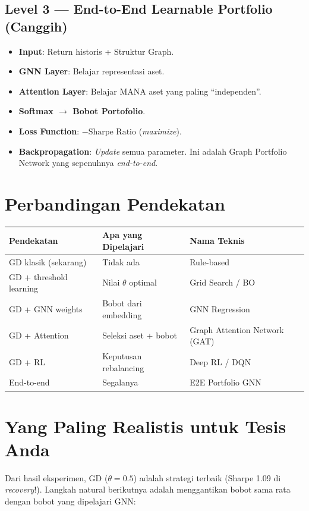 \documentclass{article}
\begin{document}
\subsection*{Level 3 — End-to-End Learnable Portfolio (Canggih)}
\begin{itemize}
    \item \textbf{Input}: Return historis + Struktur Graph.
    \item \textbf{GNN Layer}: Belajar representasi aset.
    \item \textbf{Attention Layer}: Belajar MANA aset yang paling ``independen''.
    \item \textbf{Softmax $\rightarrow$ Bobot Portofolio}.
    \item \textbf{Loss Function}: $-\text{Sharpe Ratio}$ (\textit{maximize}).
    \item \textbf{Backpropagation}: \textit{Update} semua parameter. Ini adalah Graph Portfolio Network yang sepenuhnya \textit{end-to-end}.
\end{itemize}

\section*{Perbandingan Pendekatan}

\begin{table}[h]
    \centering
    \begin{tabular}{lll}
        \toprule
        \textbf{Pendekatan} & \textbf{Apa yang Dipelajari} & \textbf{Nama Teknis} \\
        \midrule
        GD klasik (sekarang) & Tidak ada & Rule-based \\
        GD + threshold learning & Nilai $\theta$ optimal & Grid Search / BO \\
        GD + GNN weights & Bobot dari embedding & GNN Regression \\
        GD + Attention & Seleksi aset + bobot & Graph Attention Network (GAT) \\
        GD + RL & Keputusan rebalancing & Deep RL / DQN \\
        End-to-end & Segalanya & E2E Portfolio GNN \\
        \bottomrule
    \end{tabular}
\end{table}

\section*{Yang Paling Realistis untuk Tesis Anda}
Dari hasil eksperimen, GD ($\theta=0.5$) adalah strategi terbaik (Sharpe 1.09 di \textit{recovery}!). Langkah natural berikutnya adalah menggantikan bobot sama rata dengan bobot yang dipelajari GNN:
\end{document}
